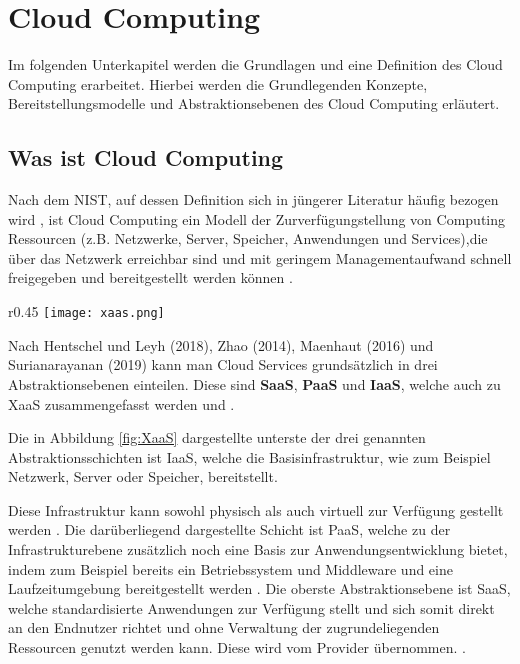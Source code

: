 \section{Cloud Computing}

Im folgenden Unterkapitel werden die Grundlagen und eine Definition des Cloud Computing erarbeitet. Hierbei werden die Grundlegenden Konzepte, Bereitstellungsmodelle und Abstraktionsebenen des Cloud Computing erläutert.

\subsection{Was ist Cloud Computing}

Nach dem \ac{NIST}, auf dessen Definition sich in jüngerer Literatur häufig bezogen wird \cite[Vgl.][S. 4f]{Reinheimer2018}, ist Cloud Computing ein Modell der Zurverfügungstellung von Computing Ressourcen (z.B. Netzwerke, Server, Speicher, Anwendungen und Services),die über das Netzwerk erreichbar sind und mit geringem Managementaufwand schnell freigegeben und bereitgestellt werden können \cite[Vgl.][S. 2]{Mell2011}\cite[Vgl.][S. 5]{Reinheimer2018}.

\begin{wrapfigure}{r}{0.45\textwidth}
\centering
\texttt{[image: xaas.png]}
\caption{Eine Übersicht der Cloud Service Modelle \cite[Eigene Darstellung nach][S. 33]{Maenhaut2016}\cite[Ergänzt durch][]{Toroman2018}}
\label{fig:XaaS}
\end{wrapfigure}

Nach Hentschel und Leyh (2018), Zhao (2014), Maenhaut (2016) und Surianarayanan (2019) kann man Cloud Services grundsätzlich in drei Abstraktionsebenen einteilen. Diese sind \textbf{\ac{SaaS}}, \textbf{\ac{PaaS}} und \textbf{\ac{IaaS}}, welche auch zu \ac{XaaS} zusammengefasst werden \cite[Vgl.][S. 9]{Reinheimer2018}\cite[Vgl.][S. 143f]{Zhao2014}\cite[Vgl.][S. 32ff]{Maenhaut2016} und \cite[Vgl.][S. 226ff]{Surianarayanan2019}.

Die in Abbildung \ref{fig:XaaS} dargestellte unterste der drei genannten Abstraktionsschichten ist \ac{IaaS}, welche die Basisinfrastruktur, wie zum Beispiel Netzwerk, Server oder Speicher, bereitstellt.

Diese Infrastruktur kann sowohl physisch als auch virtuell zur Verfügung gestellt werden \cite[Vgl.][S. 9f]{Reinheimer2018}. Die darüberliegend dargestellte Schicht ist \ac{PaaS}, welche zu der Infrastrukturebene zusätzlich noch eine Basis zur Anwendungsentwicklung bietet, indem zum Beispiel bereits ein Betriebssystem und Middleware und eine Laufzeitumgebung bereitgestellt werden \cite[Vgl.][S. 10]{Reinheimer2018}. Die oberste Abstraktionsebene ist \ac{SaaS}, welche standardisierte Anwendungen zur Verfügung stellt und sich somit direkt an den Endnutzer richtet und ohne Verwaltung der zugrundeliegenden Ressourcen genutzt werden kann. Diese wird vom Provider übernommen.
\cite[Vgl.][S. 11]{Reinheimer2018}.

